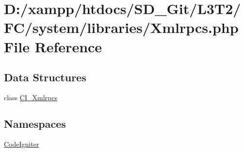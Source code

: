 \hypertarget{system_2libraries_2_xmlrpcs_8php}{}\section{D\+:/xampp/htdocs/\+S\+D\+\_\+\+Git/\+L3\+T2/\+F\+C/system/libraries/\+Xmlrpcs.php File Reference}
\label{system_2libraries_2_xmlrpcs_8php}
\subsection*{Data Structures}
\begin{DoxyCompactItemize}
\item 
class \hyperlink{class_c_i___xmlrpcs}{C\+I\+\_\+\+Xmlrpcs}
\end{DoxyCompactItemize}
\subsection*{Namespaces}
\begin{DoxyCompactItemize}
\item 
 \hyperlink{namespace_code_igniter}{Code\+Igniter}
\end{DoxyCompactItemize}
